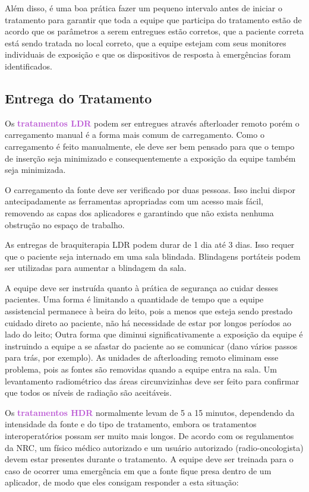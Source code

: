 \documentclass[11pt,a4paper]{article}
\newcounter{exemplo}
\begin{document}
	Além disso, é uma boa prática fazer um pequeno intervalo antes de iniciar o tratamento para garantir que toda a equipe que participa do tratamento estão de acordo que os parâmetros a serem entregues estão corretos, que a paciente correta está sendo tratada no local correto, que a equipe estejam com seus monitores individuais de exposição e que os dispositivos de resposta à emergências foram identificados.

\subsection*{Entrega do Tratamento}

	Os \textcolor{MediumOrchid}{\textbf{tratamentos LDR}} podem ser entregues através afterloader remoto porém o carregamento manual é a forma mais comum de carregamento. Como o carregamento é feito manualmente, ele deve ser bem pensado para que o tempo de inserção seja minimizado e consequentemente a exposição da equipe também seja minimizada. 

	O carregamento da fonte deve ser verificado por duas pessoas. Isso inclui dispor antecipadamente as ferramentas apropriadas com um acesso mais fácil, removendo as capas dos aplicadores e garantindo que não exista nenhuma obstrução no espaço de trabalho. 
	
	As entregas de braquiterapia LDR podem durar de 1 dia até 3 dias. Isso requer que o paciente seja internado em uma sala blindada. Blindagens portáteis podem ser utilizadas para aumentar a blindagem da sala. 
	
	A equipe deve ser instruída quanto à prática de segurança ao cuidar desses pacientes. Uma forma é limitando a quantidade de tempo que a equipe assistencial permanece à beira do leito, pois a menos que esteja sendo prestado cuidado direto ao paciente, não há necessidade de estar por longos períodos ao lado do leito; Outra forma que diminui significativamente a exposição da equipe é instruindo a equipe a se afastar do paciente ao se comunicar (dano vários passos para trás, por exemplo). As unidades de afterloading remoto eliminam esse problema, pois as fontes são removidas quando a equipe entra na sala. Um levantamento radiométrico das áreas circunvizinhas deve ser feito para confirmar que todos os níveis de radiação são aceitáveis.

	Os \textcolor{MediumOrchid}{\textbf{tratamentos HDR}} normalmente levam de 5 a 15 minutos, dependendo da intensidade da fonte e do tipo de tratamento, embora os tratamentos interoperatórios possam ser muito mais longos. De acordo com os regulamentos da NRC, um físico médico autorizado e um usuário autorizado (radio-oncologista) devem estar presentes durante o tratamento. A equipe deve ser treinada para o caso de ocorrer uma emergência em que a fonte fique presa dentro de um aplicador, de modo que eles consigam responder a esta situação:
\end{document}
